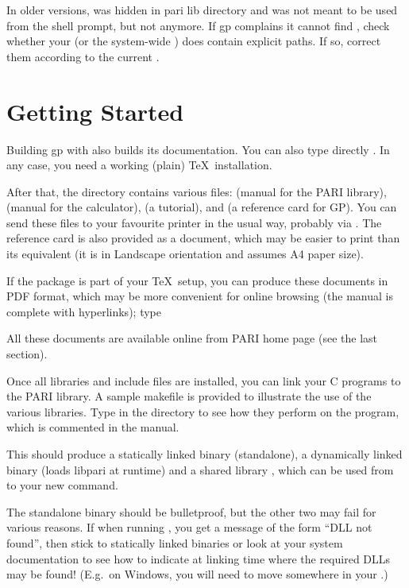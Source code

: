 In older versions,  was hidden in pari lib directory and was not
meant to be used from the shell prompt, but not anymore. If gp complains it
cannot find , check whether your  (or the system-wide
) does contain explicit paths. If so, correct them according to the
current .

\section{Getting Started}

 Building gp with  also builds
its documentation. You can also type directly . In any case,
you need a working (plain) \TeX\ installation.

After that, the  directory contains various  files:
 (manual for the PARI library),  (manual
for the  calculator),  (a tutorial), and
 (a reference card for GP). You can send these files to your
favourite printer in the usual way, probably via . The reference
card is also provided as a  document, which may be easier to
print than its  equivalent (it is in Landscape orientation and
assumes A4 paper size).

\noindent If the  package is part of your \TeX\ setup, you can
produce these documents in PDF format, which may be more convenient for
online browsing (the manual is complete with hyperlinks); type


\noindent All these documents are available online from PARI home page
(see the last section).

 Once all libraries and include files are installed,
you can link your C programs to the PARI library. A sample makefile
 is provided to illustrate the use of the various
libraries. Type  in the  directory to see how
they perform on the  program, which is commented in the
manual. 

This should produce a statically linked binary 
(standalone), a dynamically linked binary  (loads libpari
at runtime) and a shared library , which can be used from
 to  your new  command.

The standalone binary should be bulletproof, but the other two may fail
for various reasons. If when running , you get a message
of the form ``DLL not found'', then stick to statically linked binaries
or look at your system documentation to see how to indicate at linking
time where the required DLLs may be found! (E.g.~on Windows, you will
need to move  somewhere in your .)

